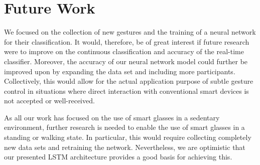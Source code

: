 \documentclass[runningheads]{llncs}
\begin{document}
\section{Future Work}
We focused on the collection of new gestures and the training of a neural network for their classification. It would, therefore, be of great interest if future research were to improve on the continuous classification and accuracy of the real-time classifier. Moreover, the accuracy of our neural network model could further be improved upon by expanding the data set and including more participants. Collectively, this would allow for the actual application purpose of subtle gesture control in situations where direct interaction with conventional smart devices is not accepted or well-received.

As all our work has focused on the use of smart glasses in a sedentary environment, further research is needed to enable the use of smart glasses in a standing or walking state. In particular, this would require collecting completely new data sets and retraining the network. Nevertheless, we are optimistic that our presented LSTM architecture provides a good basis for achieving this.



%
\end{document}
